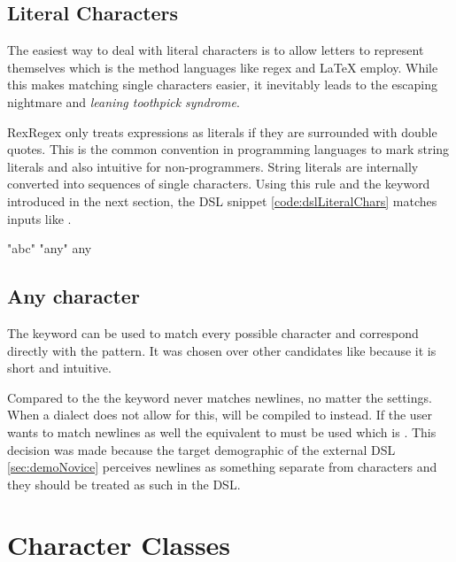 \subsection{Literal Characters}

The easiest way to deal with literal characters is to allow letters to represent themselves which is the method languages like regex and \LaTeX{} employ. While this makes matching single characters easier, it inevitably leads to the escaping nightmare and \emph{leaning toothpick syndrome}\cite{LeaningToothpick}. 

RexRegex only treats expressions as literals if they are surrounded with double quotes. This is the common convention in programming languages to mark string literals and also intuitive for non-programmers. String literals are internally converted into sequences of single characters. Using this rule and the  keyword introduced in the next section, the DSL snippet \ref{code:dslLiteralChars} matches inputs like .

\vspace{5mm}
\begin{rexregexBox}[title={Literal characters in External DSL},label=code:dslLiteralChars,width=10cm,center]
"abc"
"any"
any
\end{rexregexBox}

\subsection{Any character}

The  keyword can be used to match every possible character and correspond directly with the  pattern. It was chosen over other candidates like  because it is short and intuitive.

Compared to the  the  keyword never matches newlines, no matter the settings. When a dialect does not allow for this,  will be compiled to \pattern{[\caret\bs n]} instead. If the user wants to match newlines as well the equivalent to  must be used which is . This decision was made because the target demographic of the external DSL \ref{sec:demoNovice} perceives newlines as something separate from characters and they should be treated as such in the DSL.

\section{Character Classes} \label{sec:dslCharClasses}

